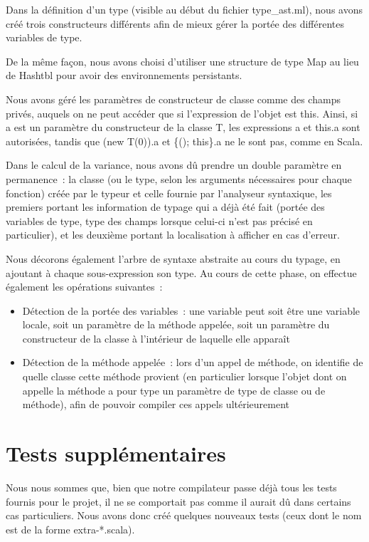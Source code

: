 \documentclass[a4paper,10pt]{article}
\newcommand{\code}[1]{{\fontfamily{pcr}\selectfont #1}}
\begin{document}
Dans la définition d'un type (visible au début du fichier
\code{type\_{}ast.ml}), nous avons créé trois constructeurs différents
afin de mieux gérer la portée des différentes variables de type.

De la même façon, nous avons choisi d'utiliser une structure de type
\code{Map} au lieu de \code{Hashtbl} pour avoir des environnements
persistants.

Nous avons géré les paramètres de constructeur de classe comme des
champs privés, auquels on ne peut accéder que si l'expression de
l'objet est \code{this}. Ainsi, si \code{a} est un paramètre du
constructeur de la classe T, les expressions \code{a} et \code{this.a}
sont autorisées, tandis que \code{(new T(0)).a} et \code{\{();
  this\}.a} ne le sont pas, comme en Scala.

Dans le calcul de la variance, nous avons dû prendre un double
paramètre en permanence~: la classe (ou le type, selon les arguments
nécessaires pour chaque fonction) créée par le typeur et celle fournie
par l'analyseur syntaxique, les premiers portant les information de
typage qui a déjà été fait (portée des variables de type, type des
champs lorsque celui-ci n'est pas précisé en particulier), et les
deuxième portant la localisation à afficher en cas d'erreur.

Nous décorons également l'arbre de syntaxe abstraite au cours du
typage, en ajoutant à chaque sous-expression son type. Au cours de
cette phase, on effectue également les opérations suivantes~:
\begin{itemize}
\item{Détection de la portée des variables~: une variable peut soit
    être une variable locale, soit un paramètre de la méthode appelée,
  soit un paramètre du constructeur de la classe à l'intérieur de
  laquelle elle apparaît}
\item{Détection de la méthode appelée~: lors d'un appel de méthode, on
  identifie de quelle classe cette méthode provient (en particulier
  lorsque l'objet dont on appelle la méthode a pour type un paramètre
  de type de classe ou de méthode), afin de pouvoir compiler ces
  appels ultérieurement}
\end{itemize}

\section{Tests supplémentaires}

Nous nous sommes que, bien que notre compilateur passe déjà tous les
tests fournis pour le projet, il ne se comportait pas comme il aurait
dû dans certains cas particuliers. Nous avons donc créé quelques
nouveaux tests (ceux dont le nom est de la forme \code{extra-*.scala}).
\end{document}
